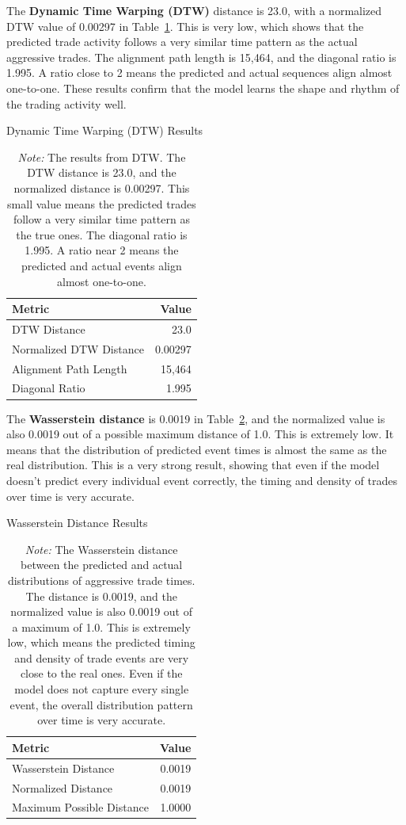 The \textbf{Dynamic Time Warping (DTW)} distance is 23.0, with a normalized DTW value of 0.00297 in Table~\ref{tab:dtw}. This is very low, which shows that the predicted trade activity follows a very similar time pattern as the actual aggressive trades. The alignment path length is 15,464, and the diagonal ratio is 1.995. A ratio close to 2 means the predicted and actual sequences align almost one-to-one. These results confirm that the model learns the shape and rhythm of the trading activity well.
\begin{table}[tbp]
    \centering
    \caption{Dynamic Time Warping (DTW) Results} \label{tab:dtw}
    \caption*{\textit{Note:} The results from DTW. The DTW distance is 23.0, and the normalized distance is 0.00297. This small value means the predicted trades follow a very similar time pattern as the true ones. The diagonal ratio is 1.995. A ratio near 2 means the predicted and actual events align almost one-to-one.}
    \begin{tabular}{lr}
    \toprule
    Metric & Value \\
    \midrule
    DTW Distance & 23.0 \\
    Normalized DTW Distance & 0.00297 \\
    Alignment Path Length & 15,464 \\
    Diagonal Ratio & 1.995 \\
    \bottomrule
    \end{tabular}
\end{table}

The \textbf{Wasserstein distance} is 0.0019 in Table~\ref{tb:wasserstein-results}, and the normalized value is also 0.0019 out of a possible maximum distance of 1.0. This is extremely low. It means that the distribution of predicted event times is almost the same as the real distribution. This is a very strong result, showing that even if the model doesn't predict every individual event correctly, the timing and density of trades over time is very accurate.
\begin{table}[tbp]
    \centering
    \caption{Wasserstein Distance Results}
    \caption*{\textit{Note:} The Wasserstein distance between the predicted and actual distributions of aggressive trade times. The distance is 0.0019, and the normalized value is also 0.0019 out of a maximum of 1.0. This is extremely low, which means the predicted timing and density of trade events are very close to the real ones. Even if the model does not capture every single event, the overall distribution pattern over time is very accurate.}
    \label{tb:wasserstein-results}
    \begin{tabular}{lr}
    \toprule
    Metric & Value \\
    \midrule
    Wasserstein Distance & 0.0019 \\
    Normalized Distance & 0.0019 \\
    Maximum Possible Distance & 1.0000 \\
    \bottomrule
    \end{tabular}
\end{table}

